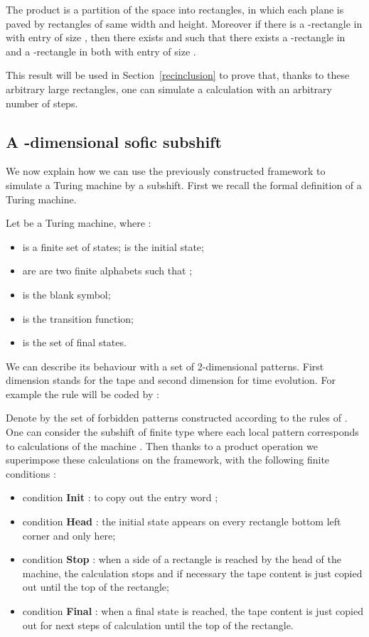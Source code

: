 \documentclass[proceedings]{stacs}
\theoremstyle{plain}\newtheorem{satz}[thm]{Satz}
\theoremstyle{definition}\newtheorem{crucial}[thm]{Crucial Definition}
\begin{document}
\begin{proposition}\label{frameworkTM}
The product  is a partition of the space into rectangles, in which each plane  is paved by rectangles of same width and height. Moreover if there is a -rectangle in  with entry of size , then there exists  and  such that there exists a -rectangle in  and a -rectangle in  both with entry of size . 
\end{proposition}

This result will be used in Section~\ref{recinclusion} to prove that, thanks to these arbitrary large rectangles, one can simulate a calculation with an arbitrary number of steps.

	\subsection{A -dimensional sofic subshift}

We now explain how we can use the previously constructed framework to simulate a Turing machine by a subshift. First we recall the formal definition of a Turing machine.

\begin{definition}
Let  be a Turing machine, where :
\begin{itemize}
\item  is a finite set of states;  is the initial state;
\item  are  are two finite alphabets such that ;
\item  is the blank symbol;
\item  is the transition function;
\item  is the set of final states.
\end{itemize}
\end{definition}

We can describe its behaviour with a set of 2-dimensional patterns. First dimension stands for the tape and second dimension for time evolution. For example the rule  will be coded by :





Denote by  the set of forbidden patterns constructed according to the rules of . One can consider the subshift of finite type  where each local pattern corresponds to calculations of the machine . Then thanks to a product operation we superimpose these calculations on the framework, with the following finite conditions :
\begin{itemize}
\item condition \textbf{Init} : to copy out the entry word ;
\item condition \textbf{Head} : the initial state  appears on every rectangle bottom left corner and only here;
\item condition \textbf{Stop} : when a side of a rectangle is reached by the head of the machine, the calculation stops and if necessary the tape content is just copied out until the top of the rectangle;
\item condition \textbf{Final} : when a final state is reached, the tape content is just copied out for next steps of calculation until the top of the rectangle.
\end{itemize}
\end{document}
